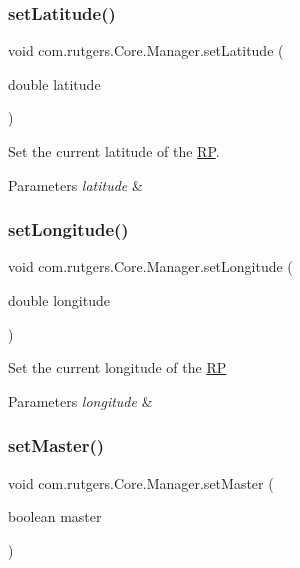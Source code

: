 \subsubsection{\texorpdfstring{set\+Latitude()}{setLatitude()}}
{\footnotesize\ttfamily void com.\+rutgers.\+Core.\+Manager.\+set\+Latitude (\begin{DoxyParamCaption}\item[{double}]{latitude }\end{DoxyParamCaption})}

Set the current latitude of the \hyperlink{classcom_1_1rutgers_1_1Core_1_1RP}{RP}. 
\begin{DoxyParams}{Parameters}
{\em latitude} & \\
\hline
\end{DoxyParams}
\mbox{\label{classcom_1_1rutgers_1_1Core_1_1Manager_a7e1ca7f9d0791baaf3b2a839dacbdc0e}} 
\subsubsection{\texorpdfstring{set\+Longitude()}{setLongitude()}}
{\footnotesize\ttfamily void com.\+rutgers.\+Core.\+Manager.\+set\+Longitude (\begin{DoxyParamCaption}\item[{double}]{longitude }\end{DoxyParamCaption})}

Set the current longitude of the \hyperlink{classcom_1_1rutgers_1_1Core_1_1RP}{RP} 
\begin{DoxyParams}{Parameters}
{\em longitude} & \\
\hline
\end{DoxyParams}
\mbox{\label{classcom_1_1rutgers_1_1Core_1_1Manager_ac1a4df15343f09e222e19aecc1a2c6f6}} 
\subsubsection{\texorpdfstring{set\+Master()}{setMaster()}}
{\footnotesize\ttfamily void com.\+rutgers.\+Core.\+Manager.\+set\+Master (\begin{DoxyParamCaption}\item[{boolean}]{master }\end{DoxyParamCaption})}

